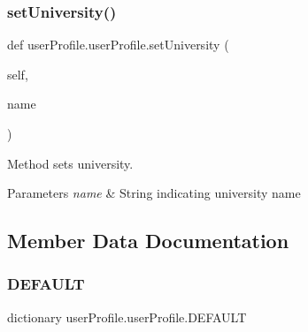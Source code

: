 \subsubsection{\texorpdfstring{set\+University()}{setUniversity()}}
{\footnotesize\ttfamily def user\+Profile.\+user\+Profile.\+set\+University (\begin{DoxyParamCaption}\item[{}]{self,  }\item[{}]{name }\end{DoxyParamCaption})}



Method sets university. 


\begin{DoxyParams}{Parameters}
{\em name} & String indicating university name \\
\hline
\end{DoxyParams}


\subsection{Member Data Documentation}
\mbox{\label{classuserProfile_1_1userProfile_ac625f3eab69fbe3d90822c139bb87ced}} 
\subsubsection{\texorpdfstring{D\+E\+F\+A\+U\+LT}{DEFAULT}}
{\footnotesize\ttfamily dictionary user\+Profile.\+user\+Profile.\+D\+E\+F\+A\+U\+LT\hspace{0.3cm}{\ttfamily [static]}}

